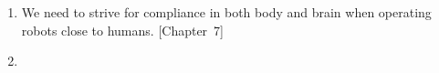 \documentclass{propositions}
\begin{document}
\begin{enumerate}
    \item %
    We need to strive for compliance in both body and brain when operating robots close to humans.
    [Chapter~7]
    \item %

\end{enumerate}
\end{document}
